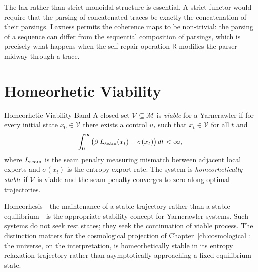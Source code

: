 \begin{remark}
The lax rather than strict monoidal structure is essential. A strict functor would
require that the parsing of concatenated traces be exactly the concatenation of
their parsings. Laxness permits the coherence maps to be non-trivial: the parsing
of a sequence can differ from the sequential composition of parsings, which is
precisely what happens when the self-repair operation $\mathsf{R}$ modifies the
parser midway through a trace.
\end{remark}

\section{Homeorhetic Viability}

\begin{definition}{Homeorhetic Viability Band}
A closed set $\mathcal{V} \subseteq \mathcal{M}$ is \emph{viable} for a
Yarncrawler if for every initial state $x_0 \in \mathcal{V}$ there exists a
control $u_t$ such that $x_t \in \mathcal{V}$ for all $t$ and
\[
  \int_0^\infty \bigl(\beta\, L_{\rm seam}(x_t) + \sigma(x_t)\bigr)\,dt < \infty,
\]
where $L_{\rm seam}$ is the seam penalty measuring mismatch between adjacent
local experts and $\sigma(x_t)$ is the entropy export rate. The system is
\emph{homeorhetically stable} if $\mathcal{V}$ is viable and the seam penalty
converges to zero along optimal trajectories.
\end{definition}

Homeorhesis---the maintenance of a stable trajectory rather than a stable
equilibrium---is the appropriate stability concept for Yarncrawler systems.
Such systems do not seek rest states; they seek the continuation of viable
process. The distinction matters for the cosmological projection of
Chapter~\ref{ch:cosmological}: the universe, on the \RSVP interpretation,
is homeorhetically stable in its entropy relaxation trajectory rather than
asymptotically approaching a fixed equilibrium state.
